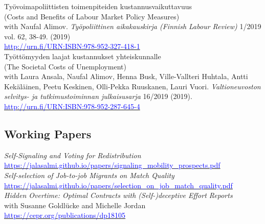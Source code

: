 \documentclass[16pt]{article}
\begin{document}
\noindent Ty\"{o}voimapoliittisten toimenpiteiden kustannusvaikuttavuus \\
\noindent (Costs and Benefits of Labour Market Policy Measures) \\
\noindent with Naufal Alimov. \textit{Ty\"{o}poliittinen aikakauskirja (Finnish Labour Review)} 1/2019 vol. 62, 38-49.  (2019) \\
\noindent \href{http://urn.fi/URN:ISBN:978-952-287-645-4}{\textcolor{blue}{http://urn.fi/URN:ISBN:978-952-327-418-1}} \\

\noindent Ty\"{o}tt\"{o}myyden laajat kustannukset yhteiskunnalle \\
\noindent (The Societal Costs of Unemployment) \\
\noindent with Laura Ansala, Naufal Alimov, Henna Busk, Ville-Vallteri Huhtala, Antti Kek\"{a}l\"{a}inen, Peetu Keskinen, Olli-Pekka Ruuskanen, Lauri Vuori.  \textit{Valtioneuvoston selvitys- ja tutkimustoiminnan julkaisusarja} 16/2019 (2019).  \\
\noindent \href{http://urn.fi/URN:ISBN:978-952-287-645-4}{\textcolor{blue}{http://urn.fi/URN:ISBN:978-952-287-645-4}} \\


\subsection*{Working Papers}

\noindent \textit{Self-Signaling and Voting for Redistribution} \\ \href{https://jalasalmi.github.io/papers/signaling\_mobility\_prospects.pdf}{\textcolor{blue}{https://jalasalmi.github.io/papers/signaling\_mobility\_prospects.pdf}} \\

\noindent \textit{Self-selection of Job-to-job Migrants on Match Quality} \\ \href{https://jalasalmi.github.io/papers/selection\_on\_job\_match\_quality.pdf}{\textcolor{blue}{https://jalasalmi.github.io/papers/selection\_on\_job\_match\_quality.pdf}} \\

\noindent \textit{Hidden Overtime: Optimal Contracts with (Self-)deceptive Effort Reports} \\
with Susanne Goldlücke and Michelle Jordan \\  \href{https://cepr.org/publications/dp18105}{\textcolor{blue}{https://cepr.org/publications/dp18105}} 
\end{document}
